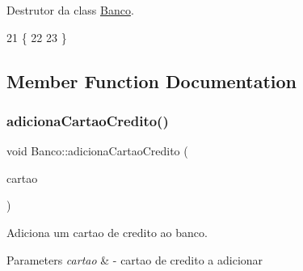 Destrutor da class \hyperlink{classBanco}{Banco}. 


\begin{DoxyCode}
21               \{
22 
23 \}
\end{DoxyCode}


\subsection{Member Function Documentation}
\mbox{\label{classBanco_a2ac1bb3c6a742743bcbb6dd0a312d74d}} 
\subsubsection{\texorpdfstring{adiciona\+Cartao\+Credito()}{adicionaCartaoCredito()}}
{\footnotesize\ttfamily void Banco\+::adiciona\+Cartao\+Credito (\begin{DoxyParamCaption}\item[{const \hyperlink{classCartaoCredito}{Cartao\+Credito} \&}]{cartao }\end{DoxyParamCaption})}



Adiciona um cartao de credito ao banco. 


\begin{DoxyParams}{Parameters}
{\em cartao} & -\/ cartao de credito a adicionar \\
\hline
\end{DoxyParams}

